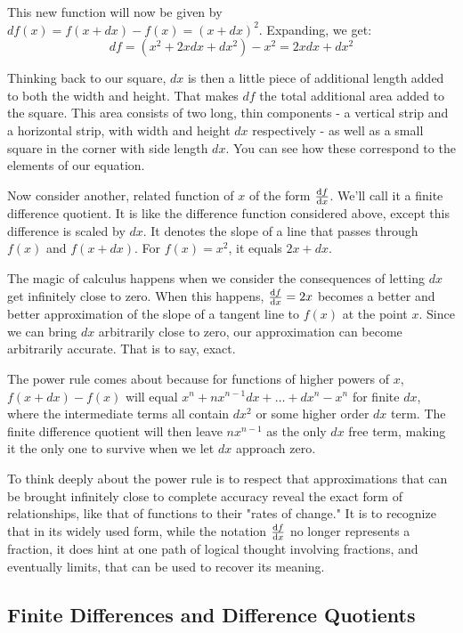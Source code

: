 \documentclass[a4paper]{article}
\begin{document}
This new function will now be given by $df(x) = f(x+dx)-f(x) = (x+dx)^2$. Expanding, we get:
$$ df = (x^2 + 2xdx + dx^2)-x^2 = 2xdx + dx^2 $$

Thinking back to our square, $dx$ is then a little piece of additional length added to both the width and height. That makes $df$ the total additional area added to the square. This area consists of two long, thin components - a vertical strip and a horizontal strip, with width and height $dx$ respectively - as well as a small square in the corner with side length $dx$. You can see how these correspond to the elements of our equation.

Now consider another, related function of $x$ of the form $\dv{f}{x} (x)$. We'll call it a finite difference quotient. It is like the difference function considered above, except this difference is scaled by $dx$. It denotes the slope of a line that passes through $f(x)$ and $f(x+dx)$. For $f(x)=x^2$, it equals $2x + dx$.

The magic of calculus happens when we consider the consequences of letting $dx$ get infinitely close to zero. When this happens, $\dv{f}{x}=2x$ becomes a better and better approximation of the slope of a tangent line to $f(x)$ at the point $x$. Since we can bring $dx$ arbitrarily close to zero, our approximation can become arbitrarily accurate. That is to say, exact.

The power rule comes about because for functions of higher powers of $x$, $f(x+dx)-f(x)$ will equal $x^n + nx^{n-1}dx + \ldots + dx^n - x^n$ for finite $dx$, where the intermediate terms all contain $dx^2$ or some higher order $dx$ term. The finite difference quotient will then leave $nx^{n-1}$ as the only $dx$ free term, making it the only one to survive when we let $dx$ approach zero.

To think deeply about the power rule is to respect that approximations that can be brought infinitely close to complete accuracy reveal the exact form of relationships, like that of functions to their "rates of change." It is to recognize that in its widely used form, while the notation $\dv{f}{x}$ no longer represents a fraction, it does hint at one path of logical thought involving fractions, and eventually limits, that can be used to recover its meaning.

\subsection{Finite Differences and Difference Quotients}
\end{document}
